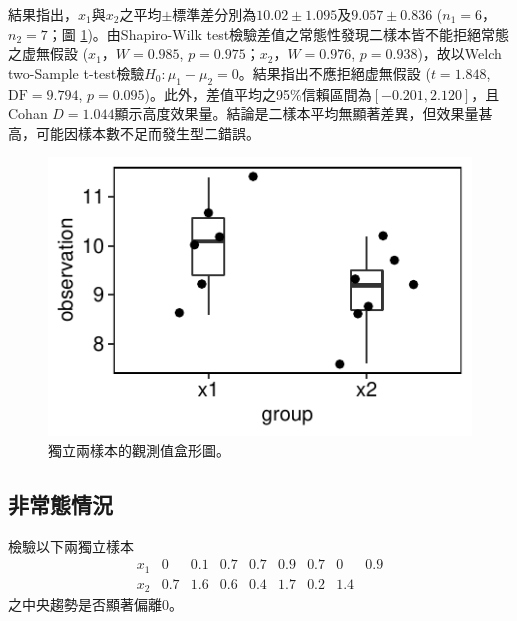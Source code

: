 \documentclass[12pt, a4paper, onecolumn]{article}
\begin{document}
結果指出，$x_1$與$x_2$之平均$\pm$標準差分別為$10.02 \pm 1.095$及$9.057 \pm 0.836$ ($n_1 = 6$，$n_2 = 7$；圖 \ref{fig:normal_independent_test})。由Shapiro-Wilk test檢驗差值之常態性發現二樣本皆不能拒絕常態之虚無假設 ($x_1$，$W = 0.985$, $p = 0.975$；$x_2$，$W = 0.976$, $p = 0.938$)，故以Welch two-Sample t-test檢驗$H_0: \mu_1 - \mu_2 = 0$。結果指出不應拒絕虚無假設 ($t = 1.848$, $\text{DF} = 9.794$, $p = 0.095$)。此外，差值平均之95\%信賴區間為$\left[-0.201, 2.120\right]$，且Cohan $D = 1.044$顯示高度效果量。結論是二樣本平均無顯著差異，但效果量甚高，可能因樣本數不足而發生型二錯誤。

\begin{figure}
	\centering
	\includegraphics[]{normal_independent_test.pdf}
	\caption{獨立兩樣本的觀測值盒形圖。}
	\label{fig:normal_independent_test}
\end{figure}

\subsection{非常態情況}
檢驗以下兩獨立樣本
\[
\begin{matrix}
x_1 & 0 & 0.1 & 0.7 & 0.7 & 0.9 & 0.7 & 0 & 0.9 \\
x_2 & 0.7 & 1.6 & 0.6 & 0.4 & 1.7 & 0.2 & 1.4 & 
\end{matrix}
\]
之中央趨勢是否顯著偏離0。
\end{document}
